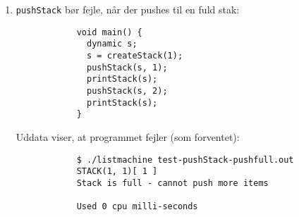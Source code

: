 \begin{enumerate}
    \item \texttt{pushStack} bør fejle, når der pushes til en fuld stak:
        \begin{verbatim}
            void main() {
              dynamic s;
              s = createStack(1);
              pushStack(s, 1);
              printStack(s);
              pushStack(s, 2);
              printStack(s);
            }
        \end{verbatim}
        Uddata viser, at programmet fejler (som forventet):
        \begin{verbatim}
            $ ./listmachine test-pushStack-pushfull.out
            STACK(1, 1)[ 1 ]
            Stack is full - cannot push more items
            
            Used 0 cpu milli-seconds
        \end{verbatim}
\end{enumerate}

